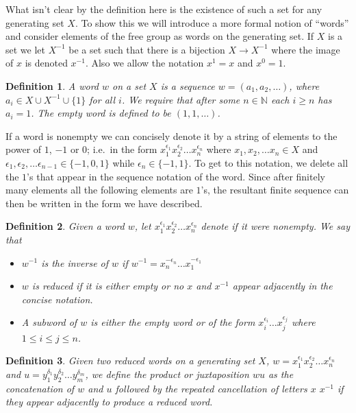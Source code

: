 \documentclass[12pt]{article}
\newtheorem{definition}{Definition}
\theoremstyle{definition}
\numberwithin{equation}{theorem}
\begin{document}
What isn't clear by the definition here is the existence of such a set for any generating set $X$. To show this we will introduce a more formal notion of ``words'' and consider elements of the free group as words on the generating set. If $X$ is a set we let $X^{-1}$ be a set such that there is a bijection $X \rightarrow X^{-1}$ where the image of $x$ is denoted $x^{-1}$. Also we allow the notation $x^1 = x$ and $x^0 = 1$.
\begin{definition}
  A \emph{word} $w$ on a set $X$ is a sequence $w = (a_1, a_2, \dots)$, where $a_i \in X \cup X^{-1} \cup \{ 1 \}$ for all $i$. We require that after some $n \in \mathbb{N}$ each $i \geq n$ has $a_i = 1$. The \emph{empty word} is defined to be $(1, 1, \dots)$.
\end{definition}
If a word is nonempty we can concisely denote it by a string of elements to the power of $1$, $-1$ or $0$; i.e.\ in the form $x_1^{\epsilon_1} x_2^{\epsilon_2} \dots x_n^{\epsilon_n}$ where $x_1, x_2, \dots x_n \in X$ and $\epsilon_1, \epsilon_2, \dots \epsilon_{n-1} \in \{-1, 0, 1\}$ while $\epsilon_n \in \{-1, 1\}$. To get to this notation, we delete all the $1$'s that appear in the sequence notation of the word. Since after finitely many elements all the following elements are $1$'s, the resultant finite sequence can then be written in the form we have described.
\begin{definition}
  Given a word $w$, let $x_1^{\epsilon_1} x_2^{\epsilon_2} \dots x_n^{\epsilon_n}$ denote if it were nonempty. We say that
  \begin{itemize}
  \item $w^{-1}$ is the \emph{inverse} of $w$ if $w^{-1} = x_n^{-\epsilon_n} \dots x_1^{-\epsilon_1}$
  \item $w$ is \emph{reduced} if it is either empty or no $x$ and $x^{-1}$ appear adjacently in the concise notation.
  \item A \emph{subword} of $w$ is either the empty word or of the form $x_i^{\epsilon_i} \dots x_j^{\epsilon_j}$ where $1 \leq i \leq j \leq n$.
  \end{itemize}
\end{definition}

\begin{definition}
  Given two reduced words on a generating set $X$, $w = x_1^{\epsilon_1} x_2^{\epsilon_2} \dots x_n^{\epsilon_n}$ and $u = y_1^{\delta_1} y_2^{\delta_2} \dots y_m^{\delta_m}$, we define the \emph{product} or \emph{juxtaposition} $wu$ as the concatenation of $w$ and $u$ followed by the repeated cancellation of letters $x$ $x^{-1}$ if they appear adjacently to produce a reduced word.
\end{definition}
\end{document}
